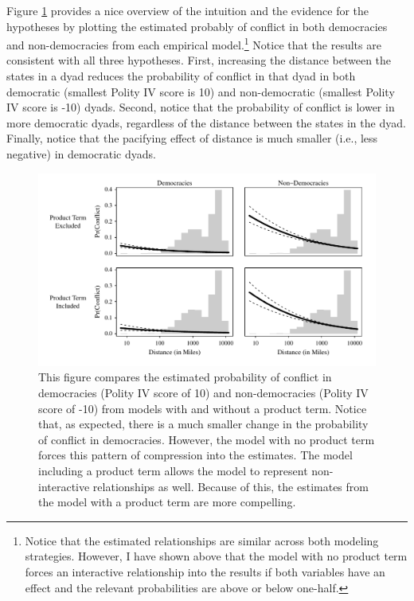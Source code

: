 \documentclass[12pt]{article}
\begin{document}
Figure \ref{fig:pr_distance} provides a nice overview of the intuition and the evidence for the hypotheses by plotting the estimated probably of conflict  in both democracies and non-democracies from each empirical model.\footnote{Notice that the estimated relationships are similar across both modeling strategies. However, I have shown above that the model with no product term forces an interactive relationship into the results if both variables have an effect and the relevant probabilities are above or below one-half.} Notice that the results are consistent with all three hypotheses. First, increasing the distance between the states in a dyad reduces the probability of conflict in that dyad in both democratic (smallest Polity IV score is 10) and non-democratic (smallest Polity IV score is -10) dyads. Second, notice that the probability of conflict is lower in more democratic dyads, regardless of the distance between the states in the dyad. Finally, notice that the pacifying effect of distance is much smaller (i.e., less negative) in democratic dyads. 

        \begin{figure}[H]
        \begin{center}
        \includegraphics[scale = .8]{fig/pr_distance.pdf}
        \end{center}\caption{This figure compares the estimated probability of conflict in democracies (Polity IV score of 10) and non-democracies (Polity IV score of -10) from models with and without a product term. Notice that, as expected, there is a much smaller change in the probability of conflict in democracies. However, the model with no product term forces this pattern of compression into the estimates. The model including a product term allows the model to represent non-interactive relationships as well. Because of this, the estimates from the model with a product term are more compelling.}\label{fig:pr_distance}
        \end{figure}
\end{document}
